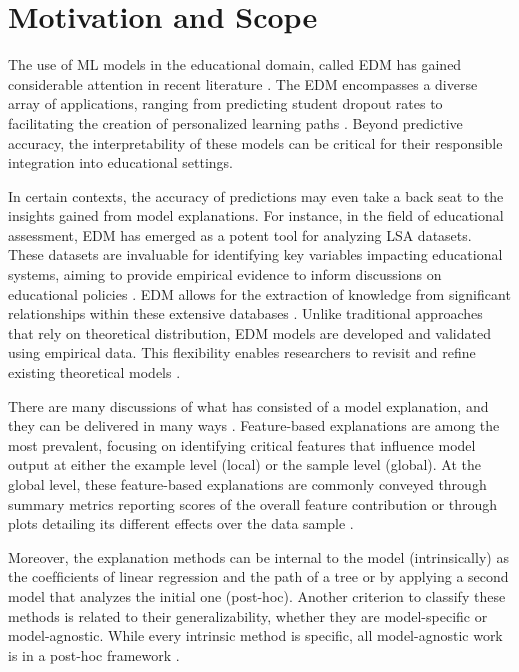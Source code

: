 \section{Motivation and Scope}
\label{motivacao}

The use of \gls{ML} models in the educational domain, called \gls{EDM} has gained considerable attention in recent literature \cite{Romero2020EducationalSurvey}. The \gls{EDM} encompasses a diverse array of applications, ranging from predicting student dropout rates \cite{Araque2009FactorsRates, Aguiar2015WhoWhy} to facilitating the creation of personalized learning paths \cite{Fancsali2018IntelligentOffs}. Beyond predictive accuracy, the interpretability of these models can be critical for their responsible integration into educational settings.

In certain contexts, the accuracy of predictions may even take a back seat to the insights gained from model explanations. For instance, in the field of educational assessment, \gls{EDM} has emerged as a potent tool for analyzing \gls{LSA} datasets. These datasets are invaluable for identifying key variables impacting educational systems, aiming to provide empirical evidence to inform discussions on educational policies  \cite{Hernandez-Torrano2021ModernLiteratureb}. \gls{EDM} allows for the extraction of knowledge from significant relationships within these extensive databases \cite{Gamazo2020AnTechniques}. Unlike traditional approaches that rely on theoretical distribution, \gls{EDM} models are developed and validated using empirical data. This flexibility enables researchers to revisit and refine existing theoretical models \cite{Huang2003InstitutePolicymakers}.

There are many discussions of what has consisted of a model explanation, and they can be delivered in many ways \cite{Guidotti2018AModels}. Feature-based explanations are among the most prevalent, focusing on identifying critical features that influence model output at either the example level (local) or the sample level (global). At the global level, these feature-based explanations are commonly conveyed through summary metrics reporting scores of the overall feature contribution or through plots detailing its different effects over the data sample \cite{SilvaFilho2023AAchievement}.

Moreover, the explanation methods can be internal to the model (intrinsically) as the coefﬁcients of linear regression and the path of a tree or by applying a second model that analyzes the initial one (post-hoc). Another criterion to classify these methods is related to their generalizability, whether they are model-speciﬁc or model-agnostic. While every intrinsic method is speciﬁc, all model-agnostic work is in a post-hoc framework \cite{SilvaFilho2021InterpretingEffects}.

